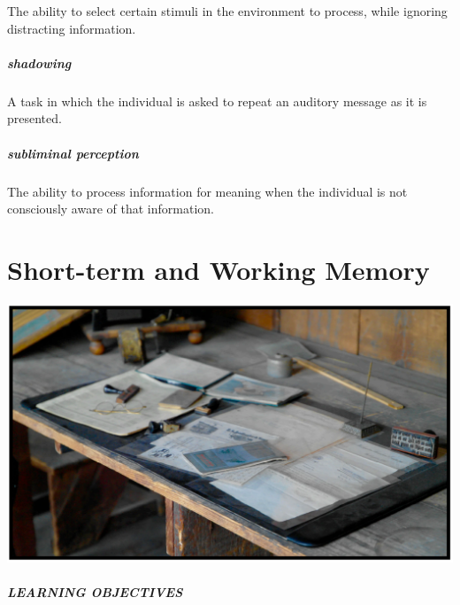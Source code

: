 \documentclass[
]{krantz}
\begin{document}
The ability to select certain stimuli in the environment to process, while ignoring distracting information.

\hypertarget{shadowing}{%
\paragraph*{shadowing}\label{shadowing}}

A task in which the individual is asked to repeat an auditory message as it is presented.

\hypertarget{subliminal-perception-1}{%
\paragraph*{subliminal perception}\label{subliminal-perception-1}}

The ability to process information for meaning when the individual is not consciously aware of that information.

\hypertarget{short-term-and-working-memory}{%
\chapter{Short-term and Working Memory}\label{short-term-and-working-memory}}

\begin{center}\includegraphics[width=1\linewidth]{images/ch4/fig0} \end{center}

\hypertarget{learning-objectives-3}{%
\paragraph*{LEARNING OBJECTIVES}\label{learning-objectives-3}}
\end{document}

